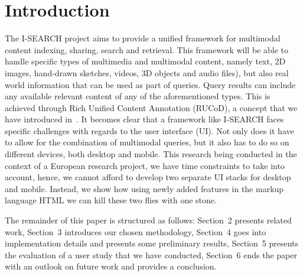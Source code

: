 \documentclass[runningheads,a4paper]{llncs} \usepackage[utf8]{inputenc}
\begin{document}
\section{Introduction}
The \mbox{I-SEARCH} project aims to provide a unified framework for multimodal content indexing, sharing, search and retrieval. This framework will be able to handle specific types of multimedia and multimodal content, namely text, 2D images, hand-drawn sketches, videos, 3D objects and audio files), but also real world information that can be used as part of queries. Query results can include any available relevant content of any of the aforementioned types. This is achieved through Rich Unified Content Annotation (RUCoD), a concept that we have introduced in~\cite{ijmis}. It becomes clear that a framework like \mbox{I-SEARCH} faces specific challenges with regards to the user interface (UI). Not only does it have to allow for the combination of multimodal queries, but it also has to do so on different devices, both desktop and mobile. This research being conducted in the context of a European research project, we have time constraints to take into account, hence, we cannot afford to develop two separate UI stacks for desktop and mobile. Instead, we show how using newly added features in the markup language HTML  we can kill these two flies with one stone.

The remainder of this paper is structured as follows: Section~2 presents related work, Section~3 introduces our chosen methodology, Section~4 goes into implementation details and presents some preliminary results, Section~5 presents the evaluation of a user study that we have conducted, Section~6 ends the paper with an outlook on future work and provides a conclusion.
\end{document}
